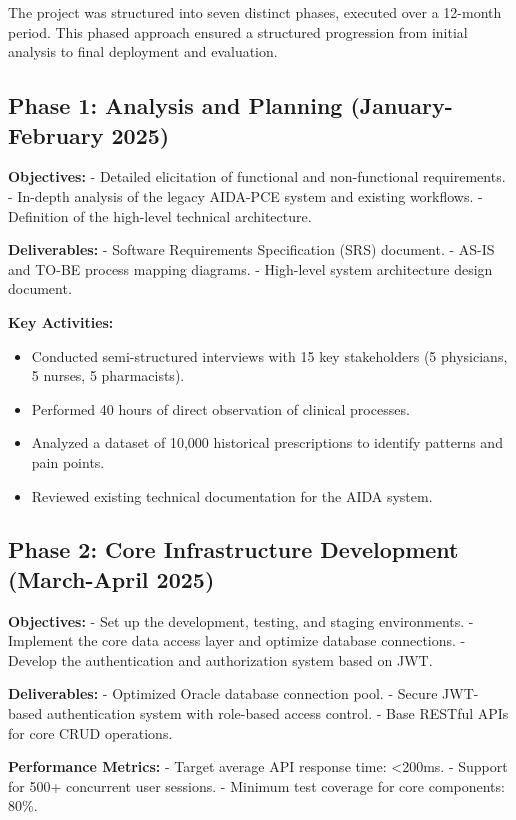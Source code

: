 The project was structured into seven distinct phases, executed over a 12-month period. This phased approach ensured a structured progression from initial analysis to final deployment and evaluation.

\subsection{Phase 1: Analysis and Planning (January-February 2025)}

\textbf{Objectives:}
- Detailed elicitation of functional and non-functional requirements.
- In-depth analysis of the legacy AIDA-PCE system and existing workflows.
- Definition of the high-level technical architecture.

\textbf{Deliverables:}
- Software Requirements Specification (SRS) document.
- AS-IS and TO-BE process mapping diagrams.
- High-level system architecture design document.

\textbf{Key Activities:}
\begin{itemize}
    \item Conducted semi-structured interviews with 15 key stakeholders (5 physicians, 5 nurses, 5 pharmacists).
    \item Performed 40 hours of direct observation of clinical processes.
    \item Analyzed a dataset of 10,000 historical prescriptions to identify patterns and pain points.
    \item Reviewed existing technical documentation for the AIDA system.
\end{itemize}

\subsection{Phase 2: Core Infrastructure Development (March-April 2025)}

\textbf{Objectives:}
- Set up the development, testing, and staging environments.
- Implement the core data access layer and optimize database connections.
- Develop the authentication and authorization system based on JWT.

\textbf{Deliverables:}
- Optimized Oracle database connection pool.
- Secure JWT-based authentication system with role-based access control.
- Base RESTful APIs for core CRUD operations.

\textbf{Performance Metrics:}
- Target average API response time: <200ms.
- Support for 500+ concurrent user sessions.
- Minimum test coverage for core components: 80\%.

